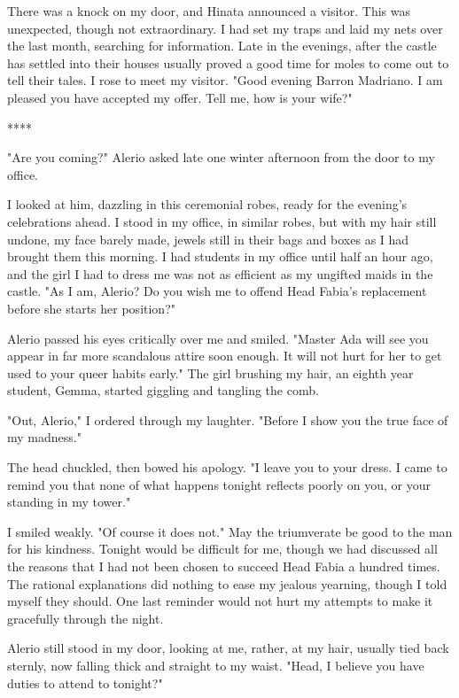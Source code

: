 \documentclass{article}
\begin{document}
There was a knock on my door, and Hinata announced a visitor. This was unexpected, though not extraordinary. I had set my traps and laid my nets over the last month, searching for information. Late in the evenings, after the castle has settled into their houses usually proved a good time for moles to come out to tell their tales. I rose to meet my visitor. "Good evening Barron Madriano. I am pleased you have accepted my offer. Tell me, how is your wife?"

\vspace{.5cm}
****


"Are you coming?" Alerio asked late one winter afternoon from the door to my office.

I looked at him, dazzling in this ceremonial robes, ready for the evening's celebrations ahead. I stood in my office, in similar robes, but with my hair still undone, my face barely made, jewels still in their bags and boxes as I had brought them this morning. I had students in my office until half an hour ago, and the girl I had to dress me was not as efficient as my ungifted maids in the castle. "As I am, Alerio? Do you wish me to offend Head Fabia's replacement before she starts her position?"

Alerio passed his eyes critically over me and smiled. "Master Ada will see you appear in far more scandalous attire soon enough. It will not hurt for her to get used to your queer habits early." The girl brushing my hair, an eighth year student, Gemma, started giggling and tangling the comb.

"Out, Alerio," I ordered through my laughter. "Before I show you the true face of my madness."

The head chuckled, then bowed his apology. "I leave you to your dress. I came to remind you that none of what happens tonight reflects poorly on you, or your standing in my tower."

I smiled weakly. "Of course it does not." May the triumverate be good to the man for his kindness. Tonight would be difficult for me, though we had discussed all the reasons that I had not been chosen to succeed Head Fabia a hundred times. The rational explanations did nothing to ease my jealous yearning, though I told myself they should. One last reminder would not hurt my attempts to make it gracefully through the night. 

Alerio still stood in my door, looking at me, rather, at my hair, usually tied back sternly, now falling thick and straight to my waist. "Head, I believe you have duties to attend to tonight?"
\end{document}
